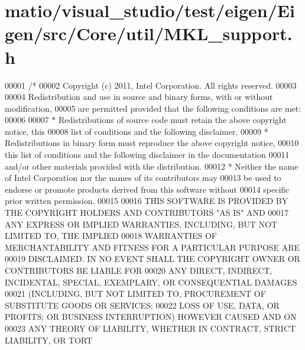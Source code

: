 \hypertarget{matio_2visual__studio_2test_2eigen_2_eigen_2src_2_core_2util_2_m_k_l__support_8h_source}{}\section{matio/visual\+\_\+studio/test/eigen/\+Eigen/src/\+Core/util/\+M\+K\+L\+\_\+support.h}
\label{matio_2visual__studio_2test_2eigen_2_eigen_2src_2_core_2util_2_m_k_l__support_8h_source}

\begin{DoxyCode}
00001 \textcolor{comment}{/*}
00002 \textcolor{comment}{ Copyright (c) 2011, Intel Corporation. All rights reserved.}
00003 \textcolor{comment}{}
00004 \textcolor{comment}{ Redistribution and use in source and binary forms, with or without modification,}
00005 \textcolor{comment}{ are permitted provided that the following conditions are met:}
00006 \textcolor{comment}{}
00007 \textcolor{comment}{ * Redistributions of source code must retain the above copyright notice, this}
00008 \textcolor{comment}{   list of conditions and the following disclaimer.}
00009 \textcolor{comment}{ * Redistributions in binary form must reproduce the above copyright notice,}
00010 \textcolor{comment}{   this list of conditions and the following disclaimer in the documentation}
00011 \textcolor{comment}{   and/or other materials provided with the distribution.}
00012 \textcolor{comment}{ * Neither the name of Intel Corporation nor the names of its contributors may}
00013 \textcolor{comment}{   be used to endorse or promote products derived from this software without}
00014 \textcolor{comment}{   specific prior written permission.}
00015 \textcolor{comment}{}
00016 \textcolor{comment}{ THIS SOFTWARE IS PROVIDED BY THE COPYRIGHT HOLDERS AND CONTRIBUTORS "AS IS" AND}
00017 \textcolor{comment}{ ANY EXPRESS OR IMPLIED WARRANTIES, INCLUDING, BUT NOT LIMITED TO, THE IMPLIED}
00018 \textcolor{comment}{ WARRANTIES OF MERCHANTABILITY AND FITNESS FOR A PARTICULAR PURPOSE ARE}
00019 \textcolor{comment}{ DISCLAIMED. IN NO EVENT SHALL THE COPYRIGHT OWNER OR CONTRIBUTORS BE LIABLE FOR}
00020 \textcolor{comment}{ ANY DIRECT, INDIRECT, INCIDENTAL, SPECIAL, EXEMPLARY, OR CONSEQUENTIAL DAMAGES}
00021 \textcolor{comment}{ (INCLUDING, BUT NOT LIMITED TO, PROCUREMENT OF SUBSTITUTE GOODS OR SERVICES;}
00022 \textcolor{comment}{ LOSS OF USE, DATA, OR PROFITS; OR BUSINESS INTERRUPTION) HOWEVER CAUSED AND ON}
00023 \textcolor{comment}{ ANY THEORY OF LIABILITY, WHETHER IN CONTRACT, STRICT LIABILITY, OR TORT}

\end{DoxyCode}
